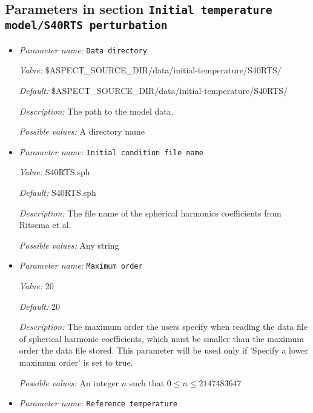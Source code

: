 \subsection{Parameters in section \tt Initial temperature model/S40RTS perturbation}
\label{parameters:Initial_20temperature_20model/S40RTS_20perturbation}

\begin{itemize}
\item {\it Parameter name:} {\tt Data directory}
\label{parameters:Initial temperature model/S40RTS perturbation/Data directory}


{\it Value:} \$ASPECT\_SOURCE\_DIR/data/initial-temperature/S40RTS/


{\it Default:} \$ASPECT\_SOURCE\_DIR/data/initial-temperature/S40RTS/


{\it Description:} The path to the model data. 


{\it Possible values:} A directory name
\item {\it Parameter name:} {\tt Initial condition file name}
\label{parameters:Initial temperature model/S40RTS perturbation/Initial condition file name}


{\it Value:} S40RTS.sph


{\it Default:} S40RTS.sph


{\it Description:} The file name of the spherical harmonics coefficients from Ritsema et al.


{\it Possible values:} Any string
\item {\it Parameter name:} {\tt Maximum order}
\label{parameters:Initial temperature model/S40RTS perturbation/Maximum order}


{\it Value:} 20


{\it Default:} 20


{\it Description:} The maximum order the users specify when reading the data file of spherical harmonic coefficients, which must be smaller than the maximum order the data file stored. This parameter will be used only if 'Specify a lower maximum order' is set to true.


{\it Possible values:} An integer $n$ such that $0\leq n \leq 2147483647$
\item {\it Parameter name:} {\tt Reference temperature}
\label{parameters:Initial temperature model/S40RTS perturbation/Reference temperature}



\end{itemize}
